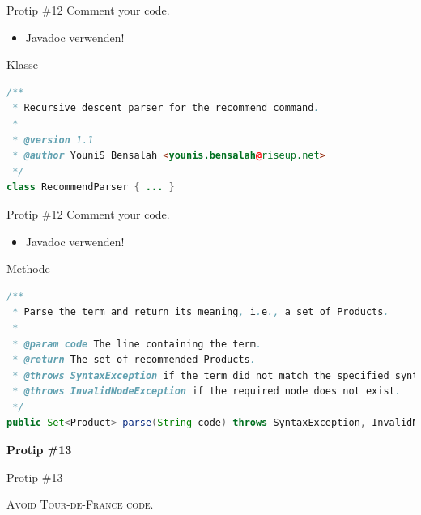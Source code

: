 \documentclass[18pt]{beamer}
\begin{document}
\begin{frame}[fragile]{Protip \#12 Comment your code.}
    \begin{itemize}
        \item Javadoc verwenden!
    \end{itemize}
    \begin{exampleblock}{Klasse}
        \begin{lstlisting}[language=Java,basicstyle=\tiny]
/**
 * Recursive descent parser for the recommend command.
 *
 * @version 1.1
 * @author YouniS Bensalah <younis.bensalah@riseup.net>
 */
class RecommendParser { ... }
        \end{lstlisting}
    \end{exampleblock}
\end{frame}

\begin{frame}[fragile]{Protip \#12 Comment your code.}
    \begin{itemize}
        \item Javadoc verwenden!
    \end{itemize}
    \begin{exampleblock}{Methode}
        \begin{lstlisting}[language=Java,basicstyle=\tiny]
/**
 * Parse the term and return its meaning, i.e., a set of Products.
 *
 * @param code The line containing the term.
 * @return The set of recommended Products.
 * @throws SyntaxException if the term did not match the specified syntax rules.
 * @throws InvalidNodeException if the required node does not exist.
 */
public Set<Product> parse(String code) throws SyntaxException, InvalidNodeException { ... }
        \end{lstlisting}
    \end{exampleblock}
\end{frame}

\begin{frame}{\quad}
    \center
    \Huge{\textbf{Protip \#13}}
\end{frame}

\begin{frame}{Protip \#13}
    \begin{block}{}
        \center
        \textsc{Avoid Tour-de-France code.}
    \end{block}
\end{frame}
\end{document}
